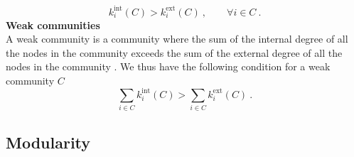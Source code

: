 \documentclass[11 pt , letterpaper , twoside , openright]{book}
\begin{document}
\begin{equation}
	k_i^{\textrm{int}}(C) > k_i^{\textrm{ext}}(C) \ , \qquad \forall i \in C \ .
\end{equation}
\newline
\textbf{Weak communities}\\
\newline
A weak community is a community where the sum of the internal degree of all the nodes in the community exceeds the sum of the external degree of all the nodes in the community \cite{Albert2016}. We thus have the following condition for a weak community $C$ \cite{Albert2016}
\begin{equation}
	\sum_{i \in C} k_i^{\textrm{int}}(C) > \sum_{i \in C}k_i^{\textrm{ext}}(C) \ .
\end{equation}

\subsection{Modularity}
\end{document}

